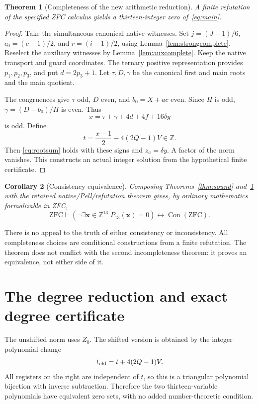 \documentclass[11pt]{article}
\newcommand{\Z}{\mathbb Z}
\newcommand{\Con}{\operatorname{Con}}
\newtheorem{theorem}{Theorem}[section]
\newtheorem{corollary}[theorem]{Corollary}
\theoremstyle{remark}
\begin{document}
\begin{theorem}[Completeness of the new arithmetic reduction]\label{thm:complete}
A finite refutation of the specified ZFC calculus yields a thirteen-integer
zero of~\eqref{eq:main}.
\end{theorem}
\begin{proof}
Take the simultaneous canonical native witnesses.
Set \(j=(J-1)/6\), \(c_0=(c-1)/2\), and
\(r=(i-1)/2\), using Lemma~\ref{lem:strongcomplete}.
Reselect the auxiliary witnesses by Lemma~\ref{lem:auxcomplete}.
Keep the native transport and guard coordinates.
The ternary positive representation provides \(p_1,p_2,p_3\), and put
\(d=2p_3+1\).
Let \(\tau,D,\gamma\) be the canonical first and main roots and the main
quotient.

The congruences give \(\tau\) odd, \(D\) even, and \(b_0=X+ac\) even.
Since \(H\) is odd, \(\gamma=(D-b_0)/H\) is even.
Thus
\[
 x=\tau+\gamma+4d+4f+16\delta y
\]
is odd. Define
\[
 t=\frac{x-1}{2}-4(2Q-1)V\in\Z.
\]
Then \eqref{eq:rootsum} holds with these signs and
\(z_a=\delta y\). A factor of the norm vanishes. This constructs an
actual integer solution from the hypothetical finite certificate.
\end{proof}

\begin{corollary}[Consistency equivalence]\label{cor:con}
Composing Theorems~\ref{thm:sound} and~\ref{thm:complete} with the retained
native/Pell/refutation theorem gives, by ordinary mathematics formalizable
in ZFC,
\[
 \mathrm{ZFC}\vdash
 \left(\neg\exists\mathbf x\in\Z^{13}\;P_{13}(\mathbf x)=0\right)
 \longleftrightarrow \Con(\mathrm{ZFC}).
\]
\end{corollary}
There is no appeal to the truth of either consistency or inconsistency.
All completeness choices are conditional constructions from a finite
refutation. The theorem does not conflict with the second incompleteness
theorem: it proves an equivalence, not either side of it.

\section{The degree reduction and exact degree certificate}

The unshifted norm uses \(Z_0\). The shifted version is obtained by the
integer polynomial change
\[
 t_{\rm old}=t+4(2Q-1)V.
\]
All registers on the right are independent of \(t\), so this is a triangular
polynomial bijection with inverse subtraction. Therefore the two
thirteen-variable polynomials have equivalent zero sets, with no added
number-theoretic condition.
\end{document}
